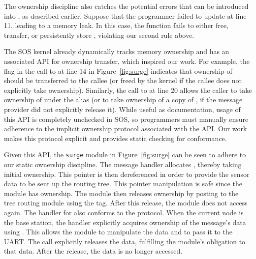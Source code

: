 The ownership discipline also catches the potential errors that can be
introduced into , as described earlier.  
%
Suppose that the programmer failed to update  at line 11,
leading to a memory leak.  
%
In this case, the  function fails to either free, transfer, or
persistently store , violating our second rule above.
 


The SOS kernel already dynamically tracks memory ownership and has an
associated API for ownership transfer, which inspired our work.  
%
For example, the  flag in the call to
 at line 14 in Figure~\ref{fig:surge} indicates that
ownership of  should be transferred to the callee (or freed by the
kernel if the callee does not explicitly take ownership).  
%
Similarly, the call to  at line 20 allows the
caller to take ownership of  under the alias  (or to
take ownership of a copy of , if the message provider did not
explicitly release it).  
%
While useful as documentation, usage of this API is completely unchecked in
SOS, so programmers must manually ensure adherence to the implicit ownership
protocol associated with the API.  
%
Our work makes this protocol explicit and provides static checking for
conformance.



Given this API, the {\tt surge} module in Figure~\ref{fig:surge} can be seen
to adhere to our static ownership discipline.  
%
The  message handler allocates , thereby
taking initial ownership. 
%
This pointer is then dereferenced in order to provide the sensor data to be
sent up the routing tree.  
%
This pointer manipulation is safe since the module has ownership.  
%
The module then releases ownership by posting  to the tree routing
module using the  tag.  
%
After this release, the module does not access  again. 
%
The handler for  also conforms to the protocol.   
%
When the current node is the base station, the handler explicitly acquires
ownership of the message's data using .  
%
This allows the module to manipulate the data and to pass it to the UART.  
%
The  call explicitly releases the data, fulfilling the
module's obligation to that data.
%
After the release, the data is no longer accessed.




